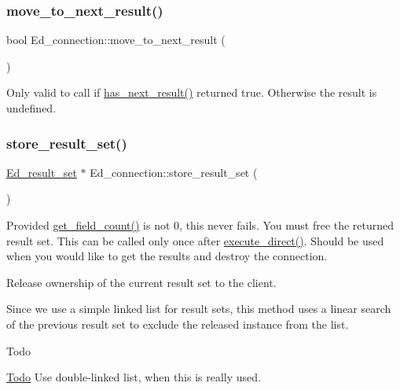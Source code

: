\subsubsection{\texorpdfstring{move\+\_\+to\+\_\+next\+\_\+result()}{move\_to\_next\_result()}}
{\footnotesize\ttfamily bool Ed\+\_\+connection\+::move\+\_\+to\+\_\+next\+\_\+result (\begin{DoxyParamCaption}{ }\end{DoxyParamCaption})\hspace{0.3cm}{\ttfamily [inline]}}

Only valid to call if \mbox{\hyperlink{classEd__connection_a6f1e1b950bf2e7c332e73579f1a2fd51}{has\+\_\+next\+\_\+result()}} returned true. Otherwise the result is undefined. \mbox{\label{classEd__connection_ad80317ac21aa245c7a0d1162ac98b264}} 
\subsubsection{\texorpdfstring{store\+\_\+result\+\_\+set()}{store\_result\_set()}}
{\footnotesize\ttfamily \mbox{\hyperlink{classEd__result__set}{Ed\+\_\+result\+\_\+set}} $\ast$ Ed\+\_\+connection\+::store\+\_\+result\+\_\+set (\begin{DoxyParamCaption}{ }\end{DoxyParamCaption})}

Provided \mbox{\hyperlink{classEd__connection_af704fb99d9029578af2d1acc301b8d51}{get\+\_\+field\+\_\+count()}} is not 0, this never fails. You must free the returned result set. This can be called only once after \mbox{\hyperlink{classEd__connection_a58f9da6381da4bc1455d7f22d1620d2d}{execute\+\_\+direct()}}. Should be used when you would like to get the results and destroy the connection.

Release ownership of the current result set to the client.

Since we use a simple linked list for result sets, this method uses a linear search of the previous result set to exclude the released instance from the list.

\begin{DoxyRefDesc}{Todo}
\item[\mbox{\hyperlink{todo__todo000111}{Todo}}]Use double-\/linked list, when this is really used.\end{DoxyRefDesc}


